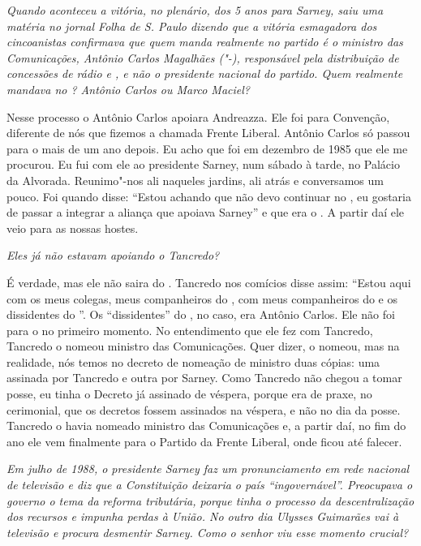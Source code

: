 \noindent\emph{Quando aconteceu a vitória, no plenário, dos 5 anos para Sarney,
saiu uma matéria no jornal \emph{Folha de S. Paulo} dizendo que a vitória
esmagadora dos cincoanistas confirmava que quem manda realmente no
partido é o ministro das Comunicações, Antônio Carlos Magalhães
("-), responsável pela distribuição de concessões de rádio e , e
não o presidente nacional do partido. Quem realmente mandava no ?
Antônio Carlos ou Marco Maciel? }

Nesse processo o Antônio Carlos apoiara Andreazza. Ele
foi para Convenção, diferente de nós que fizemos a chamada Frente
Liberal. Antônio Carlos só passou para o  mais de um ano depois. Eu
acho que foi em dezembro de 1985 que ele me procurou. Eu fui com ele ao
presidente Sarney, num sábado à tarde, no Palácio da Alvorada.
Reunimo"-nos ali naqueles jardins, ali atrás e conversamos um pouco. Foi
quando  disse: ``Estou achando que não devo continuar no , eu
gostaria de passar a integrar a aliança que apoiava Sarney'' e que era o
. A partir daí ele veio para as nossas hostes.

\medskip

\noindent\emph{Eles já não estavam apoiando o Tancredo?}

É verdade, mas ele não saira do . Tancredo nos
comícios disse assim: ``Estou aqui com os meus colegas, meus
companheiros do , com meus companheiros do  e os dissidentes do
''. Os ``dissidentes'' do ,
no caso, era Antônio Carlos. Ele não foi
para o  no primeiro momento. No entendimento que ele fez com
Tancredo, Tancredo o nomeou ministro das Comunicações. Quer dizer, o
nomeou, mas na realidade, nós temos no decreto de nomeação de ministro
duas cópias: uma assinada por Tancredo e outra por Sarney. Como Tancredo
não chegou a tomar posse, eu tinha o Decreto já assinado de véspera,
porque era de praxe, no cerimonial, que os decretos fossem assinados na
véspera, e não no dia da posse. Tancredo o havia nomeado ministro das
Comunicações e, a partir daí, no fim do ano ele vem finalmente para o
Partido da Frente Liberal, onde ficou até falecer.

\medskip

\noindent\emph{Em julho de 1988, o presidente Sarney faz um pronunciamento em
rede nacional de televisão e diz que a Constituição deixaria o país
``ingovernável''. Preocupava o governo o tema da reforma tributária,
porque tinha o processo da descentralização dos recursos e impunha
perdas à União. No outro dia Ulysses Guimarães vai à televisão e procura
desmentir Sarney. Como o senhor viu esse momento crucial? }

